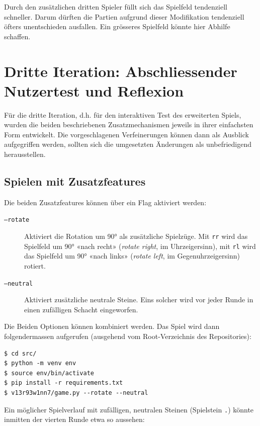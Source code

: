 \documentclass[a4paper,11pt,hidelinks]{scrartcl}
\begin{document}
Durch den zusätzlichen dritten Spieler füllt sich das Spielfeld tendenziell schneller. Darum dürften die Partien aufgrund dieser Modifikation tendenziell öfters unentschieden ausfallen. Ein grösseres Spielfeld könnte hier Abhilfe schaffen.

\clearpage

\section{Dritte Iteration: Abschliessender Nutzertest und Reflexion}

Für die dritte Iteration, d.h. für den interaktiven Test des erweiterten Spiels, wurden die beiden beschriebenen Zusatzmechanismen jeweils in ihrer einfachsten Form entwickelt. Die vorgeschlagenen Verfeinerungen können dann als Ausblick aufgegriffen werden, sollten sich die umgesetzten Änderungen als unbefriedigend herausstellen.

\subsection{Spielen mit Zusatzfeatures}

Die beiden Zusatzfeatures können über ein Flag aktiviert werden:

\begin{description}
    \item[\texttt{--rotate}] Aktiviert die Rotation um 90° als zusätzliche Spielzüge. Mit \texttt{rr} wird das Spielfeld um 90° «nach recht» (\textit{rotate right}, im Uhrzeigersinn), mit \texttt{rl} wird das Spielfeld um 90° «nach links» (\textit{rotate left}, im Gegenuhrzeigersinn) rotiert.
    \item[\texttt{--neutral}] Aktiviert zusätzliche neutrale Steine. Eins solcher wird vor jeder Runde in einen zufälligen Schacht eingeworfen.
\end{description}

Die Beiden Optionen können kombiniert werden. Das Spiel wird dann folgendermassen aufgerufen (ausgehend vom Root-Verzeichnis des Repositories):

\begin{lstlisting}
$ cd src/
$ python -m venv env
$ source env/bin/activate
$ pip install -r requirements.txt
$ v13r93w1nn7/game.py --rotate --neutral
\end{lstlisting}

Ein möglicher Spielverlauf mit zufälligen, neutralen Steinen (Spielstein \texttt{.}) könnte inmitten der vierten Runde etwa so aussehen:
\end{document}
